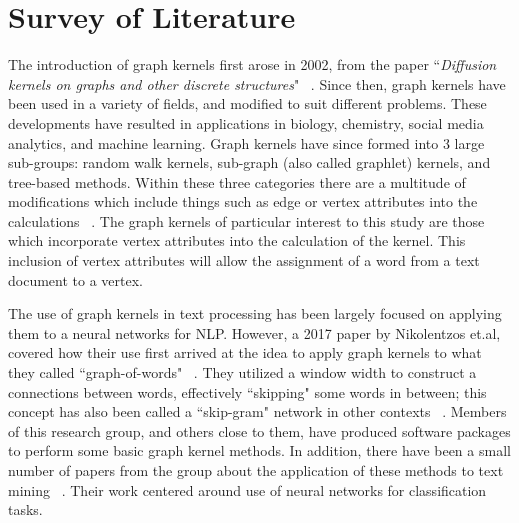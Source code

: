 \documentclass[11pt]{report}
\begin{document}
\section{Survey of Literature}


The introduction of graph kernels first arose in 2002, from the paper ``\textit{Diffusion kernels on graphs and other discrete structures}" ~\cite{kondor2002diffusion}. Since then, graph kernels have been used in a variety of fields, and modified to suit different problems. These developments have resulted in applications in biology, chemistry, social media analytics, and machine learning. Graph kernels have since formed into 3 large sub-groups: random walk kernels, sub-graph (also called graphlet) kernels, and tree-based methods. Within these three categories there are a multitude of modifications which include things such as edge or vertex attributes into the calculations ~\cite{vishwanathan2010graph}. The graph kernels of particular interest to this study are those which incorporate vertex attributes into the calculation of the kernel.  This inclusion of vertex attributes will allow the assignment of a word from a text document to a vertex. 

The use of graph kernels in text processing has been largely focused on applying them to a neural networks for NLP. However, a 2017 paper by Nikolentzos et.al, covered how their use first arrived at the idea to apply graph kernels to what they called ``graph-of-words" ~\cite{nikolentzos2017shortest}. They utilized a window width to construct a connections between words, effectively ``skipping" some words in between; this concept has also been called a ``skip-gram" network in other contexts ~\cite{cheng2006n}. Members of this research group, and others close to them, have produced software packages to perform some basic graph kernel methods. In addition, there have been a small number of papers from the group about the application of these methods to text mining ~\cite{sugiyama2018graphkernels}. Their work centered around use of neural networks for classification tasks. 
\end{document}
